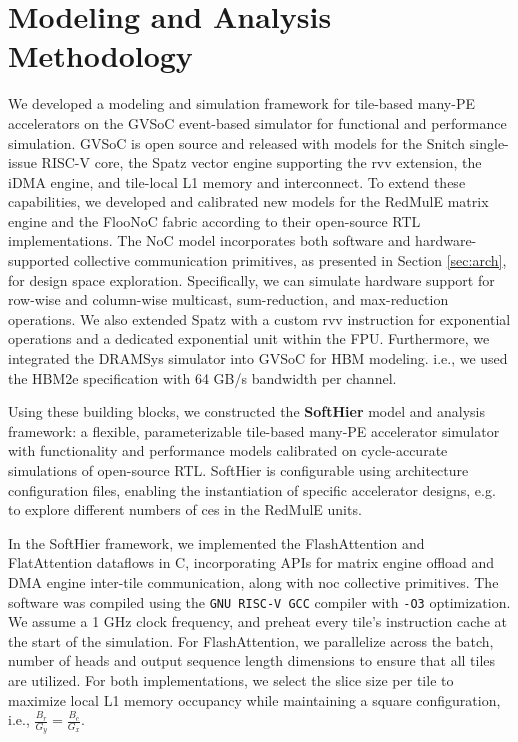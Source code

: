 \documentclass[conference]{IEEEtran}
\begin{document}
\section{Modeling and Analysis Methodology}
\label{sec:meth}

We developed a modeling and simulation framework for tile-based many-PE accelerators on the GVSoC event-based simulator \cite{gvsoc} for functional and performance simulation. GVSoC is open source and released with models for the Snitch\cite{zaruba2020snitch} single-issue RISC-V core, the Spatz\cite{perotti2025spatz} vector engine supporting the \gls{rvv} extension, the iDMA\cite{benz2023high} engine, and tile-local L1 memory and interconnect.
To extend these capabilities, we developed and calibrated new models for the RedMulE\cite{tortorella2023RedMulE} matrix engine and the FlooNoC \cite{fischer2025floonoc} fabric according to their open-source RTL implementations. The NoC model incorporates both software and hardware-supported collective communication primitives, as presented in Section \ref{sec:arch}, for design space exploration. Specifically, we can simulate hardware support for row-wise and column-wise multicast, sum-reduction, and max-reduction operations. We also extended Spatz with a custom \gls{rvv} instruction for exponential operations and a dedicated exponential unit within the FPU.
Furthermore, we integrated the DRAMSys \cite{jung2015dramsys} simulator into GVSoC for HBM modeling. i.e., we used the HBM2e specification with 64 GB/s bandwidth per channel.

Using these building blocks, we constructed the \textbf{SoftHier} model and analysis framework: a flexible, parameterizable tile-based many-PE accelerator simulator with functionality and performance models calibrated on cycle-accurate simulations of open-source RTL. SoftHier is configurable using architecture configuration files, enabling the instantiation of specific accelerator designs, e.g. to explore different numbers of \glspl{ce} in the RedMulE units.

In the SoftHier framework, we implemented the FlashAttention and FlatAttention dataflows in C, incorporating APIs for matrix engine offload and DMA engine inter-tile communication, along with \gls{noc} collective primitives. The software was compiled using the \texttt{GNU RISC-V GCC} compiler with \texttt{-O3} optimization. We assume a 1 GHz clock frequency, and preheat every tile's instruction cache at the start of the simulation. For FlashAttention, we parallelize across the batch, number of heads and output sequence length dimensions to ensure that all tiles are utilized. For both implementations, we select the slice size per tile to maximize local L1 memory occupancy while maintaining a square configuration, i.e., $\frac{B_r}{G_y} = \frac{B_c}{G_x}$.
\end{document}

